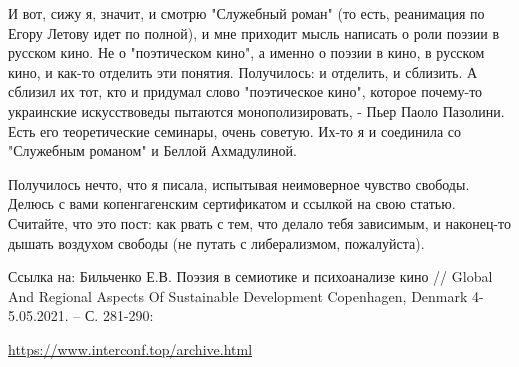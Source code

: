 И вот, сижу я, значит, и смотрю "Служебный роман" (то есть, реанимация по Егору
Летову идет по полной), и мне приходит мысль написать о роли поэзии в русском
кино. Не о "поэтическом кино", а именно о поэзии в кино, в русском кино, и
как-то отделить эти понятия. Получилось: и отделить, и сблизить. А сблизил их
тот, кто и придумал слово "поэтическое кино", которое почему-то украинские
искусствоведы пытаются монополизировать, - Пьер Паоло Пазолини. Есть его
теоретические семинары, очень советую. Их-то я и соединила со "Служебным
романом" и Беллой Ахмадулиной. 

Получилось нечто, что я писала, испытывая неимоверное чувство свободы. Делюсь с
вами копенгагенским сертификатом и ссылкой на свою статью. Считайте, что это
пост: как рвать с тем, что делало тебя зависимым, и наконец-то дышать воздухом
свободы (не путать с либерализмом, пожалуйста). 

Ссылка на: Бильченко Е.В. Поэзия в семиотике и психоанализе кино // Global And
Regional Aspects Of Sustainable Development Copenhagen, Denmark 4-5.05.2021. –
С. 281-290:

\url{https://www.interconf.top/archive.html}
